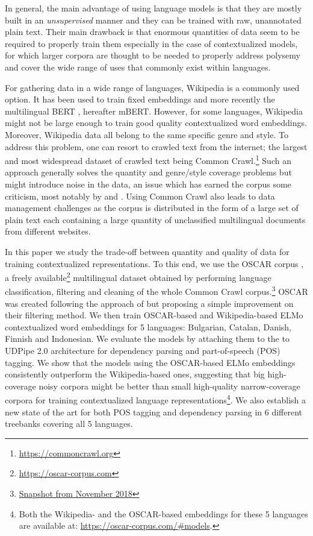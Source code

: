 In general, the main advantage of using language models is that they are mostly built in an \emph{unsupervised} manner and they can be trained with raw, unannotated plain text. Their main drawback is that enormous quantities of data seem to be required to properly train them especially in the case of contextualized models, for which larger corpora are thought to be needed to properly address polysemy and cover the wide range of uses that commonly exist within languages.

For gathering data in a wide range of languages, Wikipedia is a commonly used option. It has been used to train fixed embeddings \citep{al-rfou-etal-2013-polyglot,bojanowski-etal-2017-enriching} and more recently the multilingual BERT \citep{devlin-etal-2019-bert}, hereafter mBERT. However, for some languages, Wikipedia might not be large enough to train good quality contextualized word embeddings. Moreover, Wikipedia data all belong to the same specific genre and style. To address this problem, one can resort to crawled text from the internet; the largest and most widespread dataset of crawled text being Common Crawl.\footnote{\url{https://commoncrawl.org}} Such an approach generally solves the quantity and genre/style coverage problems but might introduce noise in the data, an issue which has earned the corpus some criticism, most notably by \citet{trinh-le-2018-a} and \citet{radford-etal-2019-language}. Using Common Crawl also leads to data management challenges as the corpus is distributed in the form of a large set of plain text each containing a large quantity of unclassified multilingual documents from different websites.


In this paper we study the trade-off between quantity and quality of data for training contextualized representations. To this end, we use the OSCAR corpus \citep{ortiz-suarez-etal-2019-asynchronous}, a freely available\footnote{\url{https://oscar-corpus.com}} multilingual dataset obtained by performing language classification, filtering and cleaning of the whole Common Crawl corpus.\footnote{\href{http://commoncrawl.org/2018/11/november-2018-crawl-archive-now-available/}{Snapshot from November 2018}} OSCAR was created following the approach of \citet{grave-etal-2018-learning} but proposing a simple improvement on their filtering method. We then train OSCAR-based and Wikipedia-based ELMo contextualized word embeddings \citep{peters-etal-2018-deep} for 5 languages: Bulgarian, Catalan, Danish, Finnish and Indonesian. We evaluate the models by attaching them to the to UDPipe 2.0 architecture \citep{straka-2018-udpipe,straka-strakova-2019-evaluating} for dependency parsing and part-of-speech (POS) tagging. We show that the models using the OSCAR-based ELMo embeddings consistently outperform the Wikipedia-based ones, suggesting that big high-coverage noisy corpora might be better than small high-quality narrow-coverage corpora for training contextualized language representations\footnote{Both the Wikipedia- and the OSCAR-based embeddings for these 5 languages are available at: \url{https://oscar-corpus.com/\#models}.}. We also establish a new state of the art for both POS tagging and dependency parsing in 6 different treebanks covering all 5 languages.


